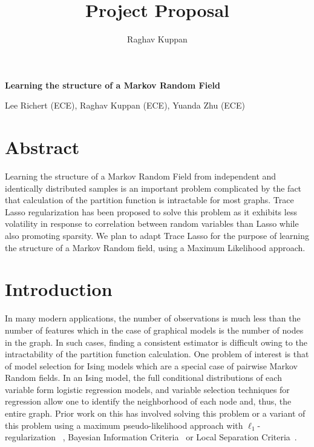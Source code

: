 \documentclass[11pt]{article}
\author{Raghav Kuppan}
\title{Project Proposal}
\begin{document}
\begin{center}
\textbf{\Large Learning the structure of a Markov Random Field}
\end{center}

\begin{center}
Lee Richert (ECE), Raghav Kuppan (ECE), Yuanda Zhu (ECE)
\end{center}



\section{Abstract}
Learning the structure of a Markov Random Field from independent and identically distributed samples is an important problem complicated by the fact that calculation of the partition function is intractable for most graphs. Trace Lasso regularization has been proposed to solve this problem as it exhibits less volatility in response to correlation between random variables than Lasso while also promoting sparsity. We plan to adapt Trace Lasso for the purpose of learning the structure of a Markov Random field, using a Maximum Likelihood approach.

\section{Introduction}
In many modern applications, the number of observations is much less than the number of features which in the case of graphical models is the number of nodes in the graph. In such cases, finding a consistent estimator is difficult owing to the intractability of the partition function calculation. One problem of interest is that of model selection for Ising models which are a special case of pairwise Markov Random fields. In an Ising model, the full conditional distributions of each variable form logistic regression models, and variable selection techniques for regression allow one to identify the neighborhood of each node and, thus, the entire graph. Prior work on this has involved solving this problem or a variant of this problem using a maximum pseudo-likelihood approach with $\ell_1$-regularization ~\cite{ravikumar2010high}, Bayesian Information Criteria~\cite{barber2015high} or Local Separation Criteria~\cite{anandkumar2012high}.\\
\end{document}
